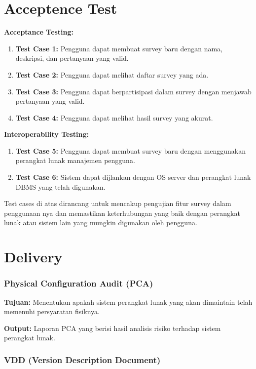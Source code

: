 \documentclass[12pt]{article}
\begin{document}
\section*{Acceptence Test}
\textbf{Acceptance Testing:}

\begin{enumerate}
    \item \textbf{Test Case 1:} Pengguna dapat membuat survey baru dengan nama, deskripsi, dan pertanyaan yang valid.
    \item \textbf{Test Case 2:} Pengguna dapat melihat daftar survey yang ada.
    \item \textbf{Test Case 3:} Pengguna dapat berpartisipasi dalam survey dengan menjawab pertanyaan yang valid.
    \item \textbf{Test Case 4:} Pengguna dapat melihat hasil survey yang akurat.
\end{enumerate}

\textbf{Interoperability Testing:}

\begin{enumerate}
    \item \textbf{Test Case 5:} Pengguna dapat membuat survey baru dengan menggunakan perangkat lunak manajemen pengguna.
    \item \textbf{Test Case 6:} Sistem dapat dijlankan dengan OS server dan perangkat lunak DBMS yang telah digunakan.
\end{enumerate}

Test cases di atas dirancang untuk mencakup pengujian fitur survey dalam penggunaan nya dan memastikan keterhubungan yang baik dengan perangkat lunak atau sistem lain  yang mungkin digunakan oleh pengguna.

\section*{Delivery}
\subsubsection*{Physical Configuration Audit (PCA)}

\textbf{Tujuan:} Menentukan apakah sistem perangkat lunak yang akan dimaintain telah memenuhi persyaratan fisiknya.

\textbf{Output:} Laporan PCA yang berisi hasil analisis risiko terhadap sistem perangkat lunak.

\subsubsection*{VDD (Version Description Document)}
\end{document}
